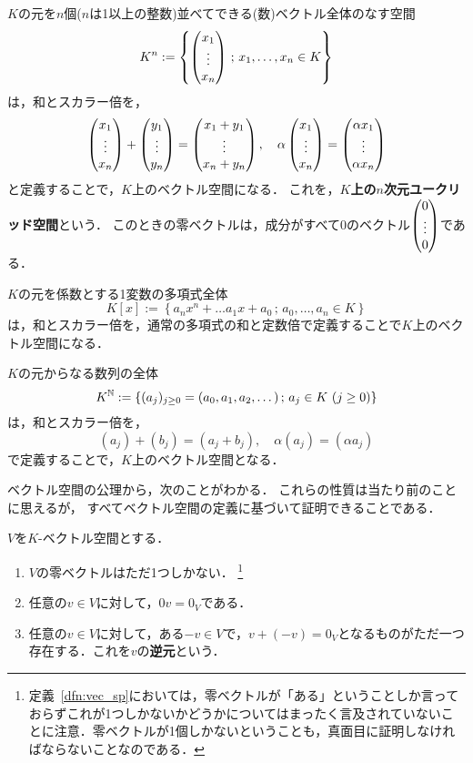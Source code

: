 \begin{example}
    $K$の元を$n$個($n$は1以上の整数)並べてできる(数)ベクトル全体のなす空間
    \[
        K^n := \left\{ \begin{pmatrix} x_1 \\ \vdots \\ x_n \end{pmatrix} \,;\, x_1,\dots,x_n \in K \right\}
    \]
    は，和とスカラー倍を，
    \[
        \begin{pmatrix} x_1 \\ \vdots \\ x_n \end{pmatrix} + \begin{pmatrix} y_1 \\ \vdots \\ y_n \end{pmatrix}
        = \begin{pmatrix} x_1+y_1  \\ \vdots \\ x_n+y_n \end{pmatrix}, \quad
        \alpha \begin{pmatrix} x_1  \\ \vdots \\ x_n \end{pmatrix} = \begin{pmatrix}  \alpha x_1  \\ \vdots \\ \alpha x_n \end{pmatrix}
    \]
    と定義することで，$K$上のベクトル空間になる．
    これを，\textbf{$K$上の$n$次元ユークリッド空間}という．
    このときの零ベクトルは，成分がすべて0のベクトル$\begin{pmatrix} 0  \\ \vdots \\ 0 \end{pmatrix}$である．
\end{example}
\begin{example}
    $K$の元を係数とする1変数の多項式全体
    \[
        K[x] := \left\{ a_n x^n + \dots a_1 x + a_0 \,;\, a_0,\dots,a_n \in K\right\}
    \]
    は，和とスカラー倍を，通常の多項式の和と定数倍で定義することで$K$上のベクトル空間になる．
\end{example}
\begin{example}
    $K$の元からなる数列の全体
    \[
        K^{\mathbb{N}} := \left\{ (a_j)_{j\ge 0} = (a_0,a_1,a_2,\dots) \,;\, a_j \in K\ (j \ge 0) \right\}
    \]
    は，和とスカラー倍を，
    \[
        (a_j) + (b_j) = (a_j+b_j),\quad \alpha (a_j) = (\alpha a_j)
    \]
    で定義することで，$K$上のベクトル空間となる．
\end{example}
ベクトル空間の公理から，次のことがわかる．
これらの性質は当たり前のことに思えるが，
すべてベクトル空間の定義に基づいて証明できることである．
\begin{prop}
    $V$を$K$-ベクトル空間とする．
    \begin{enumerate}
        \item $V$の零ベクトルはただ1つしかない．
        \footnote{定義~\ref{dfn:vec_sp}においては，零ベクトルが「ある」ということしか言っておらずこれが1つしかないかどうかについてはまったく言及されていないことに注意．零ベクトルが1個しかないということも，真面目に証明しなければならないことなのである．}
        \item 任意の$v \in V$に対して，$0v = 0_V$である．
        \item 任意の$v \in V$に対して，ある$-v \in V$で，$v + (-v) = 0_V$となるものがただ一つ存在する．これを$v$の\textbf{逆元}という．
    \end{enumerate}
\end{prop}
